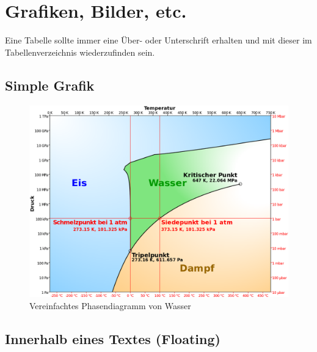 \newpage

\section{Grafiken, Bilder, etc.}

Eine Tabelle sollte immer eine Über- oder Unterschrift erhalten und mit dieser im Tabellenverzeichnis wiederzufinden sein.

\subsection{Simple Grafik}

\begin{figure}[H]
	\centering
	\includegraphics[width=\linewidth]{content/to-be-removed/Phase_diagram_of_water_simplified.svg.png}
	\caption{Vereinfachtes Phasendiagramm von Wasser \cite{TestCitation020}}
\end{figure}

\newpage

\subsection{Innerhalb eines Textes (Floating)}

